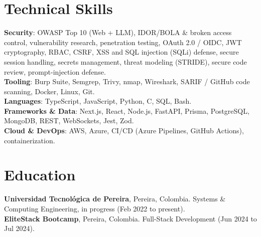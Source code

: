 \section{Technical Skills}
\vspace{-2pt}
 \begin{itemize}[leftmargin=0.15in, label={}]
    \small{\item{
     \textbf{Security}{: OWASP Top 10 (Web + LLM), IDOR/BOLA \& broken access control, vulnerability research, penetration testing, OAuth 2.0 / OIDC, JWT cryptography, RBAC, CSRF, XSS and SQL injection (SQLi) defense, secure session handling, secrets management, threat modeling (STRIDE), secure code review, prompt-injection defense.} \\[0.4mm]
     \textbf{Tooling}{: Burp Suite, Semgrep, Trivy, nmap, Wireshark, SARIF / GitHub code scanning, Docker, Linux, Git.} \\[0.4mm]
     \textbf{Languages}{: TypeScript, JavaScript, Python, C, SQL, Bash.} \\[0.4mm]
     \textbf{Frameworks \& Data}{: Next.js, React, Node.js, FastAPI, Prisma, PostgreSQL, MongoDB, REST, WebSockets, Jest, Zod.} \\[0.4mm]
     \textbf{Cloud \& DevOps}{: AWS, Azure, CI/CD (Azure Pipelines, GitHub Actions), containerization.} \\[0.4mm]
    }}
 \end{itemize}
 \vspace{-11pt}
\section{Education}
\vspace{-2pt}
 \begin{itemize}[leftmargin=0.15in, label={}]
    \small{\item{
     \textbf{Universidad Tecnológica de Pereira}{, Pereira, Colombia. Systems \& Computing Engineering, in progress (Feb 2022 to present).} \\[0.4mm]
     \textbf{EliteStack Bootcamp}{, Pereira, Colombia. Full-Stack Development (Jun 2024 to Jul 2024).} \\[0.4mm]
    }}
 \end{itemize}


